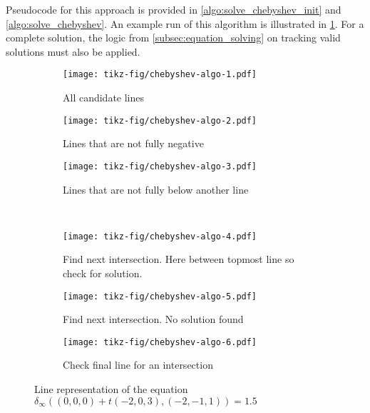 Pseudocode for this approach is provided in \cref{algo:solve_chebyshev_init} and \cref{algo:solve_chebyshev}. An example run of this algorithm is illustrated in \cref{fig:chebyshev_algo}. For a complete solution, the logic from \cref{subsec:equation_solving} on tracking valid solutions must also be applied.

\begin{figure}
  \centering 
  \begin{subfigure}[ht]{0.3\textwidth}
    \texttt{[image: tikz-fig/chebyshev-algo-1.pdf]}
    \caption{All candidate lines}
  \end{subfigure}
  \begin{subfigure}[ht]{0.3\textwidth}
    \texttt{[image: tikz-fig/chebyshev-algo-2.pdf]}
    \caption{Lines that are not fully negative}
  \end{subfigure}
  \begin{subfigure}[ht]{0.3\textwidth}
    \texttt{[image: tikz-fig/chebyshev-algo-3.pdf]}
    \caption{Lines that are not fully below another line}
  \end{subfigure}\\
  \begin{subfigure}[ht]{0.3\textwidth}
    \texttt{[image: tikz-fig/chebyshev-algo-4.pdf]}
    \caption{Find next intersection. Here between topmost line so check for solution.}
  \end{subfigure}
  \begin{subfigure}[ht]{0.3\textwidth}
    \texttt{[image: tikz-fig/chebyshev-algo-5.pdf]}
    \caption{Find next intersection. No solution found}
  \end{subfigure}
  \begin{subfigure}[ht]{0.3\textwidth}
    \texttt{[image: tikz-fig/chebyshev-algo-6.pdf]}
    \caption{Check final line for an intersection}
  \end{subfigure}
  \caption{Line representation of the equation \(\delta_\infty((0,0,0) + t(-2,0,3), (-2,-1,1)) = 1.5\)}
  \label{fig:chebyshev_algo}
\end{figure}

